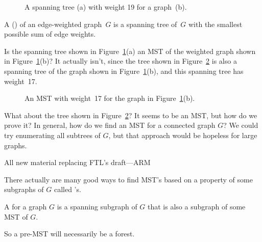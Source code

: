 \begin{figure}

%
\qquad
%

\caption{A spanning tree (a) with weight 19 for a graph~(b).}

\label{fig:5KA}

\end{figure}

\iffalse
The goal, of course, is to find the spanning tree with minimum weight,
called the minimum weight spanning tree (MST for short).
\fi

\begin{definition}
A  (\textup{}\textup) of
an edge-weighted graph~$G$ is a spanning tree of~$G$ with the
smallest possible sum of edge weights.
\end{definition}

Is the spanning tree shown in Figure~\ref{fig:5KA}(a) an MST of the
weighted graph shown in Figure~\ref{fig:5KA}(b)?  It actually isn't,
since the tree shown in Figure~\ref{fig:5KB} is also a spanning tree
of the graph shown in Figure~\ref{fig:5KA}(b), and this spanning tree
has weight~17.

\begin{figure}


\caption{An MST with weight~17 for the graph in
  Figure~\ref{fig:5KA}(b).}
\label{fig:5KB}

\end{figure}

What about the tree shown in Figure~\ref{fig:5KB}?  It seems to be an
MST, but how do we prove it?  In general, how do we find an MST for a
connected graph $G$?  We could try enumerating all subtrees of $G$,
but that approach would be hopeless for large graphs.

\begin{editingnotes}
All new material replacing FTL's draft---ARM
\end{editingnotes}

There actually are many good ways to find MST's based on a property of
some subgraphs of $G$ called 's.

\begin{definition}
A  for a graph $G$ is a spanning
subgraph of $G$ that is also a subgraph of some MST of $G$.
\end{definition}
So a pre-MST will necessarily be a forest.

